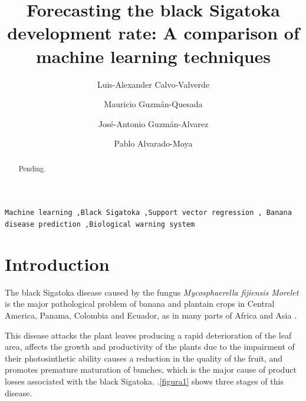 \documentclass[review]{elsarticle}
\begin{document}
\begin{frontmatter}

\title{Forecasting the black Sigatoka development rate: A comparison of machine learning techniques 
}

\author[afiLuisAlex]{Luis-Alexander Calvo-Valverde}

\author[afiCorbana] {Mauricio Guzm\'an-Quesada}
\author[afiCorbana]{Jos\'e-Antonio Guzm\'an-Alvarez}
\author[afiPablo]{Pablo Alvarado-Moya}

\address[afiLuisAlex]{DOCINADE, Instituto Tecnol\'ogico de Costa Rica, 
Computer Research Center, Multidisciplinar program eScience, 
CNCA/CeNAT, Cartago, Costa Rica}

\address[afiCorbana]{Direcci\'on de Investigaciones, Corporaci\'on Bananera Nacional S.A., Gu\'apiles, Costa Rica}

\address[afiPablo]{DOCINADE, Instituto Tecnol\'ogico de Costa Rica, Cartago, Costa Rica}




\begin{abstract}
Pending.
\end{abstract}

\begin{keyword}
\texttt{Machine learning \sep Black Sigatoka \sep Support vector regression \sep
Banana disease prediction \sep Biological warning system }
\end{keyword}

\end{frontmatter}

\linenumbers

\section{Introduction}

The black Sigatoka disease caused by the fungus {\it Mycosphaerella
  fijiensis Morelet} is the major pathological problem of banana and
plantain crops in Central America, Panama, Colombia and Ecuador, as in
many parts of Africa and Asia \citep{MarinVargas1995}.

This disease attacks the plant leaves producing a rapid deterioration
of the leaf area, affects the growth and productivity of the plants due to the impairment of their photosinthetic ability  causes a reduction in the quality
of the fruit, and promotes premature maturation of bunches, which is
the major cause of product losses associated with the black Sigatoka. \figurename
$.$\ref{figura1} shows three stages of this disease.
\end{document}
